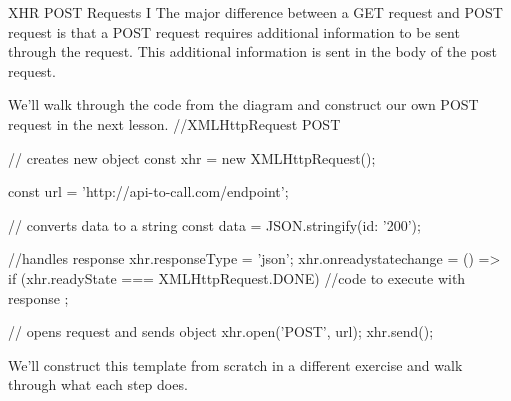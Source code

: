 XHR POST Requests I
    The major difference between a GET request and POST request is that a POST request requires additional information to be sent through the request. This additional information is sent in the body of the post request.

    We’ll walk through the code from the diagram and construct our own POST request in the next lesson.
        //XMLHttpRequest POST

        // creates new object
        const xhr = new XMLHttpRequest();
        
        const url = 'http://api-to-call.com/endpoint';

        // converts data to a string
        const data = JSON.stringify({id: '200'});


        //handles response
        xhr.responseType = 'json';
        xhr.onreadystatechange = () => {
            if (xhr.readyState === XMLHttpRequest.DONE) {
                //code to execute with response
            }
        };

        // opens request and sends object
        xhr.open('POST', url);
        xhr.send();
        

    We’ll construct this template from scratch in a different exercise and walk through what each step does.